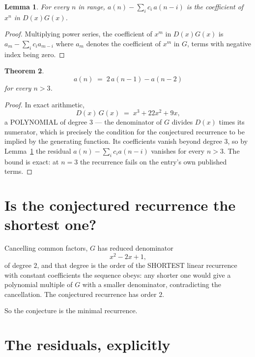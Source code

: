 \documentclass[11pt,a4paper]{article}
\theoremstyle{plain}
\newtheorem{theorem}{Theorem}
\newtheorem{lemma}[theorem]{Lemma}
\theoremstyle{definition}
\begin{document}
\begin{lemma}\label{lem:key}
For every $n$ in range, $a(n)-\sum_i c_i\,a(n-i)$ is the coefficient of $x^{n}$ in
$D(x)G(x)$.
\end{lemma}

\begin{proof}
Multiplying power series, the coefficient of $x^{m}$ in $D(x)G(x)$ is
$a_m-\sum_i c_i a_{m-i}$ where $a_m$ denotes the coefficient of $x^{m}$ in $G$, terms with
negative index being zero.
\end{proof}

\begin{theorem}
\[
a(n)\;=\;2\,a(n-1) - a(n-2)
\]
for every $n>3$.
\end{theorem}

\begin{proof}
In exact arithmetic,
\[
D(x)\,G(x)\;=\;x^{3} + 22 x^{2} + 9 x,
\]
a POLYNOMIAL of degree $3$ --- the denominator of $G$ divides $D(x)$ times its numerator,
which is precisely the condition for the conjectured recurrence to be implied by the
generating function. Its coefficients vanish beyond degree $3$, so by
Lemma~\ref{lem:key} the residual $a(n)-\sum_ic_ia(n-i)$ vanishes for every
$n>3$. The bound is exact: at $n=3$ the recurrence fails on the entry's own published terms.
\end{proof}

\section{Is the conjectured recurrence the shortest one?}

Cancelling common factors, $G$ has reduced denominator
\[
x^{2} - 2 x + 1,
\]
of degree $2$, and that degree is the order of the SHORTEST linear recurrence with
constant coefficients the sequence obeys: any shorter one would give a polynomial multiple of
$G$ with a smaller denominator, contradicting the cancellation. The conjectured recurrence has
order $2$.

So the conjecture is the minimal recurrence.

\section{The residuals, explicitly}
\end{document}
